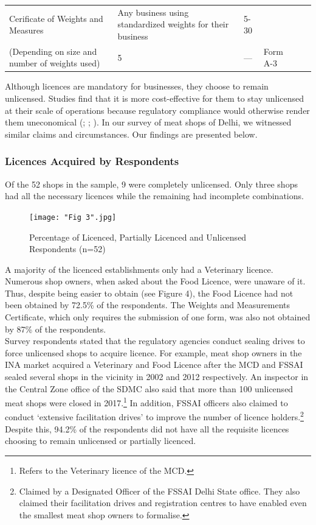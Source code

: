 \documentclass[a4paper, 12pt]{article}
\begin{document}
\begin{longtable}{>{\raggedright}p{2cm}>{\raggedright}p{3cm}>{\raggedright}p{3cm}>{\raggedright}p{2cm}>{\centering}p{1cm}>{\centering\arraybackslash}p{2cm}}
\midrule
Cerificate of Weights and Measures & Any business using standardized weights for their business & 5-30  \\
(Depending on size and number of weights used) & 5 & --- & Form A-3 \\
\bottomrule
\end{longtable}
\normalsize


Although licences are mandatory for businesses, they choose to remain unlicensed. Studies find that it is more cost-effective for them to stay unlicensed at their scale of operations because regulatory compliance would otherwise render them uneconomical (\cite{desotopaper}; \cite{duttapaper}; \cite{laportapaper}). In our survey of meat shops of Delhi, we witnessed similar claims and circumstances. Our findings are presented below. \\

\subsubsection{Licences Acquired by Respondents}
Of the 52 shops in the sample, 9 were completely unlicensed. Only three shops had all the necessary licences while the remaining had incomplete combinations.\\

\begin{figure}[H]
\centering
\texttt{[image: "Fig 3".jpg]}
\caption{Percentage of Licenced, Partially Licenced and Unlicensed Respondents (n=52)}
\end{figure} 

A majority of the licenced establishments only had a Veterinary licence. Numerous shop owners, when asked about the Food Licence, were unaware of it. Thus, despite being easier to obtain (see Figure 4), the Food Licence had not been obtained by 72.5\% of the respondents. The Weights and Measurements Certificate, which only requires the submission of one form, was also not obtained by 87\% of the respondents. \\

Survey respondents stated that the regulatory agencies conduct sealing drives to force unlicensed shops to acquire licence. For example, meat shop owners in the INA market acquired a Veterinary and Food Licence after the MCD and FSSAI sealed several shops in the vicinity in 2002 and 2012 respectively. An inspector in the Central Zone office of the SDMC also said that more than 100 unlicensed meat shops were closed in 2017.\footnote{ Refers to the Veterinary licence of the MCD.} In addition, FSSAI officers also claimed to conduct ‘extensive facilitation drives’ to improve the number of licence holders.\footnote{Claimed by a Designated Officer of the FSSAI Delhi State office. They also claimed their facilitation drives and registration centres to have enabled even the smallest meat shop owners to formalise.}
Despite this, 94.2\% of the respondents did not have all the requisite licences choosing to remain unlicensed or partially licenced.\\
\end{document}
